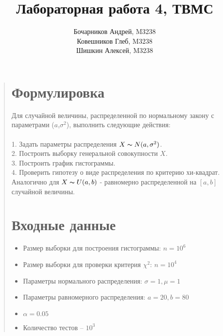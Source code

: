 \documentclass{article}
\begin{document}
\title{Лабораторная работа 4, ТВМС}
\author{
	Бочарников Андрей, M3238\\
	Ковешников Глеб, M3238\\
	Шишкин Алексей, M3238
}
\maketitle

\begin{quote}
\section{Формулировка}
	Для случайной величины, распределенной по нормальному закону с параметрами ($a$,$\sigma^2$), выполнить следующие действия:\\\\
	1. Задать параметры распределения $X \thicksim N(a, \sigma^2)$.\\
	2. Построить выборку генеральной совокупности $X$.\\
	3. Построить график гистограммы.\\
	4. Проверить гипотезу о виде распределения по критерию хи-квадрат.\\
	Аналогично для $X \thicksim U(a, b)$ - равномерно распределенной на $[a, b]$ случайной величины.
\section{Входные данные}
        \begin{itemize}
            \item Размер выборки для построения гистограммы: $n = 10^6$
	    \item Размер выборки для проверки критерия $\chi^2$: $n = 10^4$
            \item Параметры нормального распределения: $\sigma = 1, \mu = 1$
	    \item Параметры равномерного распределения: $a = 20, b = 80$
            \item $\alpha = 0.05$
	    \item Количество тестов -- $10^3$
        \end{itemize}

\end{quote}
\end{document}
